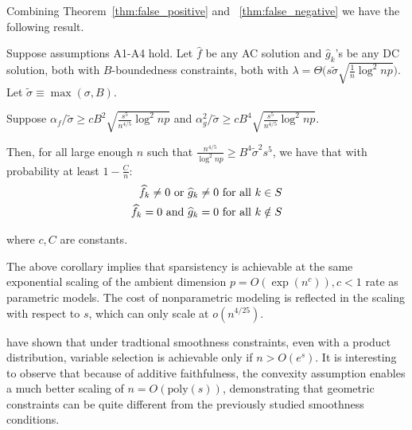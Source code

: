 Combining Theorem~\ref{thm:false_positive} and
~\ref{thm:false_negative} 
we have the following result.
\begin{corollary}
Suppose assumptions A1-A4 hold. Let $\hat{f}$ be any AC solution and $\hat{g}_k$'s be any DC solution, both with $B$-boundedness constraints, both with 
$\lambda = \Theta\big( s \tilde{\sigma} \sqrt{\frac{1}{n} \log^2 np} \big) $. Let $\tilde{\sigma} \equiv \max(\sigma, B)$.


Suppose 
$\alpha_f/\tilde{\sigma} \geq c B^2 \sqrt{\frac{s^5}{n^{4/5}} \log^2 np}$ and $\alpha_g^2/\tilde{\sigma} \geq c B^4 \sqrt{\frac{s^5}{n^{4/5}} \log^2 np}$.

Then, for all large enough $n$ such that $\frac{n^{4/5}}{\log^2 np} \geq B^4 \tilde{\sigma}^2 s^5$, we have that with probability at least $1-\frac{C}{n}$:
\begin{align*}
\widehat{f}_k \neq 0 \textrm{ or } \widehat{g}_k \neq 0 &\textrm{ for all } k \in S\\
\widehat{f}_k = 0 \textrm{ and } \widehat{g}_k = 0 & \textrm{ for all } k \notin S
\end{align*}

where $c,C$ are constants.

\end{corollary}
The above corollary implies that sparsistency is achievable at the same exponential scaling of the ambient dimension $p = O(\exp(n^c)), c<1$ rate as parametric models. The cost of nonparametric modeling is reflected in the scaling with respect to $s$, which can only scale at $o(n^{4/25})$.

\begin{remark}
\citet{dalalyan:12} have shown that under tradtional smoothness constraints, even with a product distribution, variable selection is achievable only if $n > O(e^s)$. It is interesting to observe that because of additive faithfulness, the convexity assumption enables a much better scaling of $n = O(\textrm{poly}(s))$, demonstrating that geometric constraints can be quite different from the previously studied smoothness conditions.
\end{remark}



 
